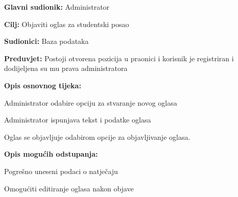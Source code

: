 \noindent {}
\begin{packed_item}
	
	\item \textbf{Glavni sudionik: } Administrator
	\item  \textbf{Cilj:} Objaviti oglas za studentski posao
	\item  \textbf{Sudionici:} Baza podataka
	\item  \textbf{Preduvjet:} Postoji otvorena pozicija u praonici i korisnik je registriran i dodijeljena su mu prava administratora
	\item  \textbf{Opis osnovnog tijeka:}
	
	\item[] \begin{packed_enum}
		
		\item Administrator odabire opciju za stvaranje novog oglasa
		\item Administrator ispunjava tekst i podatke oglasa
		\item Oglas se objavljuje odabirom opcije za objavljivanje oglasa.
	\end{packed_enum}
	
	\item  \textbf{Opis mogućih odstupanja:}
	
	\item[] \begin{packed_item}
		
		\item[2.a] Pogrešno uneseni podaci o natječaju
		\item[] \begin{packed_enum}
			
			\item Omogućiti editiranje oglasa nakon objave
			
		\end{packed_enum}				
	\end{packed_item}
\end{packed_item}

